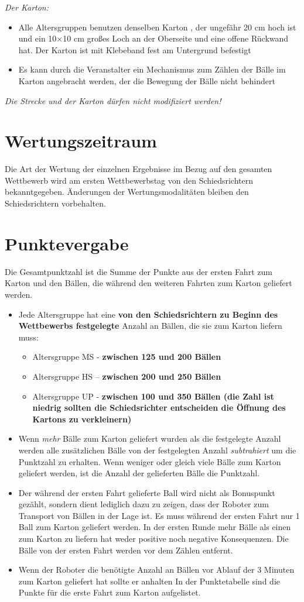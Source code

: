 \documentclass[a4paper,12pt]{article}
\begin{document}
\emph{Der Karton:}
\begin{itemize}
\item Alle Altersgruppen benutzen denselben Karton , der ungefähr 20 cm hoch ist und ein 10×10 cm großes Loch
an der Oberseite und eine offene Rückwand hat. Der Karton ist mit Klebeband fest am Untergrund befestigt
\item Es kann durch die Veranstalter ein Mechanismus zum Zählen der Bälle im Karton angebracht werden, der die
Bewegung der Bälle nicht behindert
\end{itemize}
\emph{Die Strecke und der Karton dürfen nicht modifiziert werden!}
\section{Wertungszeitraum}
\par Die Art der Wertung der einzelnen Ergebnisse im Bezug auf den gesamten Wettbewerb wird am ersten Wettbewerbstag von den Schiedsrichtern bekanntgegeben. Änderungen der Wertungsmodalitäten bleiben den Schiedsrichtern vorbehalten.
\section{Punktevergabe}
Die Gesamtpunktzahl ist die Summe der Punkte aus der ersten Fahrt zum Karton und den Bällen, die während
den weiteren Fahrten zum Karton geliefert werden.
\begin{itemize}
\item Jede Altersgruppe hat eine \textbf{von den Schiedsrichtern zu Beginn des Wettbewerbs festgelegte} Anzahl an Bällen, die sie zum Karton liefern muss:
\begin{itemize}
	\item Altersgruppe MS - \textbf{zwischen 125 und 200 Bällen}
\item Altersgruppe HS – \textbf{zwischen 200 und 250 Bällen}
\item Altersgruppe UP - \textbf{zwischen 100 und 350 Bällen (die Zahl ist niedrig sollten die Schiedsrichter
entscheiden die Öffnung des Kartons zu verkleinern)}
\end{itemize}
\item Wenn \emph{mehr} Bälle zum Karton geliefert wurden als die festgelegte Anzahl werden alle zusätzlichen Bälle von
der festgelegten Anzahl \emph{subtrahiert} um die Punktzahl zu erhalten. Wenn weniger oder gleich viele Bälle zum
Karton geliefert werden, ist die Anzahl der gelieferten Bälle die Punktzahl.
\item Der während der ersten Fahrt gelieferte Ball wird nicht als Bonuspunkt gezählt, sondern dient lediglich dazu
zu zeigen, dass der Roboter zum Transport von Bällen in der Lage ist. Es muss während der ersten Fahrt nur
1 Ball zum Karton geliefert werden. In der ersten Runde mehr Bälle als einen zum Karton zu liefern hat weder
positive noch negative Konsequenzen. Die Bälle von der ersten Fahrt werden vor dem Zählen entfernt.
\item Wenn der Roboter die benötigte Anzahl an Bällen vor Ablauf der 3 Minuten zum Karton geliefert hat sollte er
anhalten
In der Punktetabelle sind die Punkte für die erste Fahrt zum Karton aufgelistet.
\end{itemize}
\end{document}
